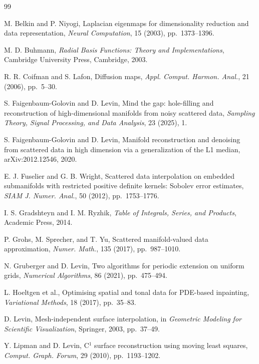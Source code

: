 \documentclass[11pt,oneside,reqno]{amsart}
\theoremstyle{plain}
\numberwithin{equation}{section}
\begin{document}
\begin{thebibliography}{99}

M. Belkin and P. Niyogi,
Laplacian eigenmaps for dimensionality reduction and data representation,
\emph{Neural Computation}, 15 (2003), pp.~1373--1396.

M. D. Buhmann,
\emph{Radial Basis Functions: Theory and Implementations},
Cambridge University Press, Cambridge, 2003.

R. R. Coifman and S. Lafon,
Diffusion maps,
\emph{Appl. Comput. Harmon. Anal.}, 21 (2006), pp.~5--30.

S. Faigenbaum-Golovin and D. Levin,
Mind the gap: hole-filling and reconstruction of high-dimensional manifolds from noisy scattered data,
\emph{Sampling Theory, Signal Processing, and Data Analysis}, 23 (2025), 1.

S. Faigenbaum-Golovin and D. Levin,
Manifold reconstruction and denoising from scattered data in high dimension via a generalization of the L1 median,
arXiv:2012.12546, 2020.

E. J. Fuselier and G. B. Wright,
Scattered data interpolation on embedded submanifolds with restricted positive definite kernels: Sobolev error estimates,
\emph{SIAM J. Numer. Anal.}, 50 (2012), pp.~1753--1776.

I. S. Gradshteyn and I. M. Ryzhik,
\emph{Table of Integrals, Series, and Products},
Academic Press, 2014.

P. Grohs, M. Sprecher, and T. Yu,
Scattered manifold-valued data approximation,
\emph{Numer. Math.}, 135 (2017), pp.~987--1010.

N. Gruberger and D. Levin,
Two algorithms for periodic extension on uniform grids,
\emph{Numerical Algorithms}, 86 (2021), pp.~475--494.

L. Hoeltgen et al.,
Optimising spatial and tonal data for PDE-based inpainting,
\emph{Variational Methods}, 18 (2017), pp.~35--83.

D. Levin,
Mesh-independent surface interpolation,
in \emph{Geometric Modeling for Scientific Visualization},
Springer, 2003, pp.~37--49.

Y. Lipman and D. Levin,
C$^1$ surface reconstruction using moving least squares,
\emph{Comput. Graph. Forum}, 29 (2010), pp.~1193--1202.


\end{thebibliography}
\end{document}
